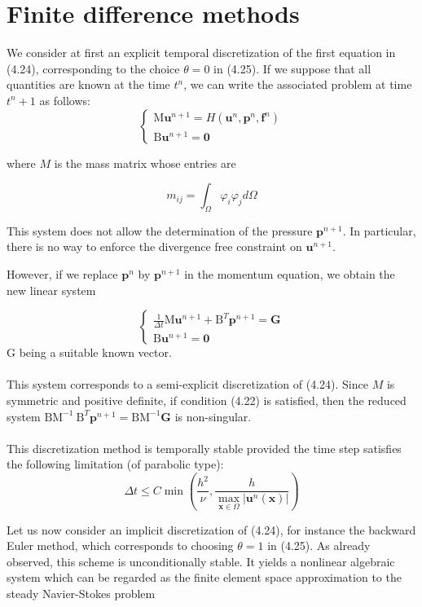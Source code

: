 \documentclass[11pt]{book}
\begin{document}
\section{Finite difference methods}
We consider at first an explicit temporal discretization of the first equation in (4.24), corresponding to the choice $\theta=0$ in (4.25). If we suppose that all quantities are known at the time $t^{n}$, we can write the associated problem at time $t^{n}+1$ as follows:
\begin{equation}
    \left\{\begin{array}{l}
\mathrm{M} \mathbf{u}^{n+1}=H\left(\mathbf{u}^{n}, \mathbf{p}^{n}, \mathbf{f}^{n}\right) \\
\mathrm{B} \mathbf{u}^{n+1}=\mathbf{0}
\end{array}\right.
\end{equation}

where $M$ is the mass matrix whose entries are

$$
m_{i j}=\int_{\Omega} \varphi_{i} \varphi_{j} d \Omega
$$

This system does not allow the determination of the pressure $\mathbf{p}^{n+1}$. In particular, there is no way to enforce the divergence free constraint on $\mathbf{u}^{n+1}$.

However, if we replace $\mathbf{p}^{n}$ by $\mathbf{p}^{n+1}$ in the momentum equation, we obtain the new linear system

$$
\left\{\begin{array}{l}
\frac{1}{\Delta t} \mathrm{M}\mathbf{u}^{n+1}+\mathrm{B}^{T} \mathbf{p}^{n+1}=\mathbf{G} \\
\mathrm{B} \mathbf{u}^{n+1}=\mathbf{0}
\end{array}\right.
$$
$\mathrm{G}$ being a suitable known vector. \\ \\
\noindent This system corresponds to a semi-explicit discretization of (4.24). Since $M$ is symmetric and positive definite, if condition (4.22) is satisfied, then the reduced system $\mathrm{BM}^{-1} \mathrm{~B}^{T} \mathbf{p}^{n+1}=\mathrm{BM}^{-1} \mathbf{G}$ is non-singular.\\ \\
This discretization method is temporally stable provided the time step satisfies the following limitation (of parabolic type):
$$
\Delta t \leq C \min \left(\frac{h^{2}}{\nu}, \frac{h}{\max _{\mathbf{x} \in \Omega}\left|\mathbf{u}^{n}(\mathbf{x})\right|}\right)
$$

\noindent Let us now consider an implicit discretization of (4.24), for instance the backward Euler method, which corresponds to choosing $\theta=1$ in (4.25). As already observed, this scheme is unconditionally stable. It yields a nonlinear algebraic system which can be regarded as the finite element space approximation to the steady Navier-Stokes problem
\end{document}
